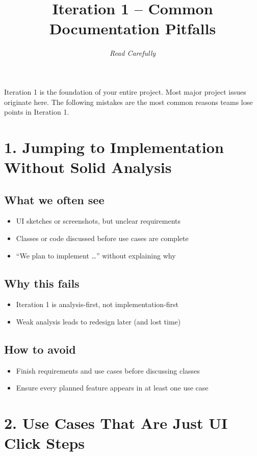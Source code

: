 \documentclass{article}
\title{\textbf{Iteration 1 -- Common Documentation Pitfalls}}
\author{\textit{Read Carefully}}
\date{}
\begin{document}
\maketitle

Iteration 1 is the foundation of your entire project. Most major project issues originate here. The following mistakes are the most common reasons teams lose points in Iteration 1.

\section*{1. Jumping to Implementation Without Solid Analysis}

\subsection*{What we often see}
\begin{itemize}[noitemsep]
    \item UI sketches or screenshots, but unclear requirements
    \item Classes or code discussed before use cases are complete
    \item ``We plan to implement \dots'' without explaining why
\end{itemize}

\subsection*{Why this fails}
\begin{itemize}[noitemsep]
    \item Iteration 1 is analysis-first, not implementation-first
    \item Weak analysis leads to redesign later (and lost time)
\end{itemize}

\subsection*{How to avoid}
\begin{itemize}[noitemsep]
    \item Finish requirements and use cases before discussing classes
    \item Ensure every planned feature appears in at least one use case
\end{itemize}

\section*{2. Use Cases That Are Just UI Click Steps}
\end{document}
